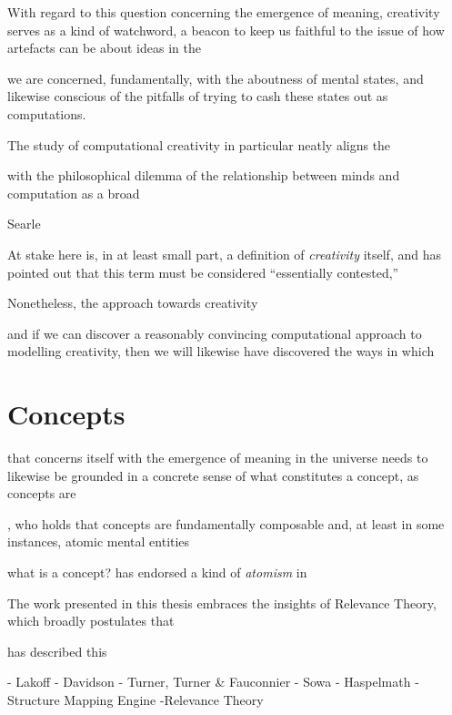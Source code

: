 With regard to this question concerning the emergence of meaning, creativity serves as a kind of watchword, a beacon to keep us faithful to the issue of how artefacts can be about ideas in the 

we are concerned, fundamentally, with the aboutness of mental states, and likewise conscious of the pitfalls of trying to cash these states out as computations.

The study of computational creativity in particular neatly aligns the 

with the philosophical dilemma of the relationship between minds and computation as a broad

Searle

At stake here is, in at least small part, a definition of \emph{creativity} itself, and \cite{Colton} has pointed out that this term must be considered ``essentially contested,''

Nonetheless, the approach towards creativity 

and if we can discover a reasonably convincing computational approach to modelling creativity, then we will likewise have discovered the ways in which 

\section{Concepts}

that concerns itself with the emergence of meaning in the universe needs to likewise be grounded in a concrete sense of what constitutes a concept, as concepts are

\cite{Fodor}, who holds that concepts are fundamentally composable and, at least in some instances, atomic mental entities

what is a concept?  \cite{Fodor} has endorsed a kind of \emph{atomism} in 

\citep[cf][for a case against conceptual schema in general]{Davidson}

The work presented in this thesis embraces the insights of Relevance Theory, which broadly postulates that 

\cite{Carston} has described this 

- Lakoff
- Davidson
- Turner, Turner & Fauconnier
- Sowa
- Haspelmath
- Structure Mapping Engine
-Relevance Theory

